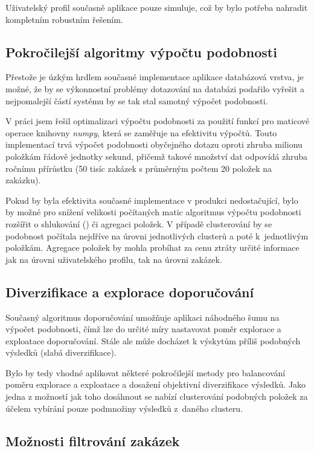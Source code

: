 \documentclass[thesis=M,czech]{FITthesis}[2019/12/23]
\begin{document}
Uživatelský profil současně aplikace pouze simuluje, což by bylo potřeba nahradit kompletním robustním řešením.

\subsection{Pokročilejší algoritmy výpočtu podobnosti}

Přestože je úzkým hrdlem současné implementace aplikace databázová vrstva, je možné, že by se výkonnostní problémy dotazování na databázi podařilo vyřešit a nejpomalejší částí systému by se tak stal samotný výpočet podobnosti.

V práci jsem řešil optimalizaci výpočtu podobnosti za použití funkcí pro maticové operace knihovny \textit{numpy}, která se zaměřuje na efektivitu výpočtů.
Touto implementací trvá výpočet podobnosti obyčejného dotazu oproti zhruba milionu položkám řádově jednotky sekund, přičemž takové množství dat odpovídá zhruba ročnímu přírůstku (50 tisíc zakázek s průměrným počtem 20 položek na zakázku).

Pokud by byla efektivita současné implementace v produkci nedostačující, bylo by možné pro snížení velikosti počítaných matic algoritmus výpočtu podobnosti rozšířit o shlukování () či agregaci položek. V případě clusterování by se podobnost počítala nejdříve na úrovni jednotlivých clusterů a poté k~jednotlivým položkám. Agregace položek by mohla probíhat za cenu ztráty určité informace jak na úrovni uživatelského profilu, tak na úrovni zakázek.

\subsection{Diverzifikace a explorace doporučování}

Současný algoritmus doporučování umožňuje aplikaci náhodného šumu na výpočet podobnosti, čímž lze do určité míry nastavovat poměr explorace a exploatace doporučování. Stále ale může docházet k výskytům příliš podobných výsledků (slabá diverzifikace).

Bylo by tedy vhodné aplikovat některé pokročilejší metody pro balancování poměru explorace a exploatace a dosažení objektivní diverzifikace výsledků.
Jako jedna z možností jak toho dosáhnout se nabízí clusterování podobných položek za účelem vybírání pouze podmnožiny výsledků z~daného clusteru.

\subsection{Možnosti filtrování zakázek}
\end{document}
